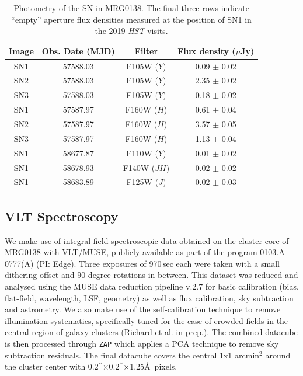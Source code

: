 \documentclass[12pt]{article}
\gdef\arcsec{$^{\prime\prime}$}
\begin{document}
{\begin{table}[ht]
\centering
\begin{tabular}{cccc}
Image & Obs. Date (MJD) & Filter & Flux density ($\mu$Jy) \\
\midrule
SN1 & 57588.03 & F105W ($Y$) & 0.09  $\pm$ 0.02 \\
SN2 & 57588.03 & F105W ($Y$) & 2.35  $\pm$ 0.02 \\
SN3 & 57588.03 & F105W ($Y$) & 0.18  $\pm$ 0.02 \\
SN1 & 57587.97 & F160W ($H$) & 0.61  $\pm$ 0.04 \\
SN2 & 57587.97 & F160W ($H$) & 3.57  $\pm$ 0.05 \\
SN3 & 57587.97 & F160W ($H$) & 1.13  $\pm$ 0.04 \\
\midrule
SN1 & 58677.87 & F110W ($Y$) & 0.01  $\pm$ 0.02 \\
SN1 & 58678.93 & F140W ($JH$) & 0.02  $\pm$ 0.02 \\
SN1 & 58683.89 & F125W ($J$) & 0.02  $\pm$ 0.03 \\
\end{tabular}
\caption{Photometry of the SN in MRG0138.  The final three rows indicate ``empty'' aperture flux densities measured at the position of SN1 in the 2019 \textit{HST} visits.
\label{tab:photometry}}
\end{table}

\subsection*{VLT Spectroscopy}
\label{sec:vltmuse}

We make use of integral field spectroscopic data obtained on the cluster core of MRG0138 with VLT/MUSE, publicly 
available as part of the program 0103.A-0777(A) (PI: Edge). Three exposures of 970\,sec each were taken with a small dithering offset and 90 degree rotations in between. This dataset was reduced and analysed using the MUSE data reduction pipeline v.2.7 \cite{weilbacher_data_2020} for basic calibration (bias, flat-field, wavelength, LSF, geometry) as well as flux calibration, sky subtraction and astrometry.  We  also make use of the self-calibration technique \cite{bacon_muse_2017} to remove illumination systematics, specifically tuned for the case of crowded fields in the central region of galaxy clusters (Richard et al. in prep.). The combined datacube is then processed through {\tt ZAP} \cite{soto_zap_2016} which applies a PCA technique to remove sky subtraction residuals. The final datacube covers the central 1x1 arcmin$^2$ around the cluster center with 0.2\arcsec$\times$0.2\arcsec$\times$1.25\AA\ pixels.

}
\end{document}
